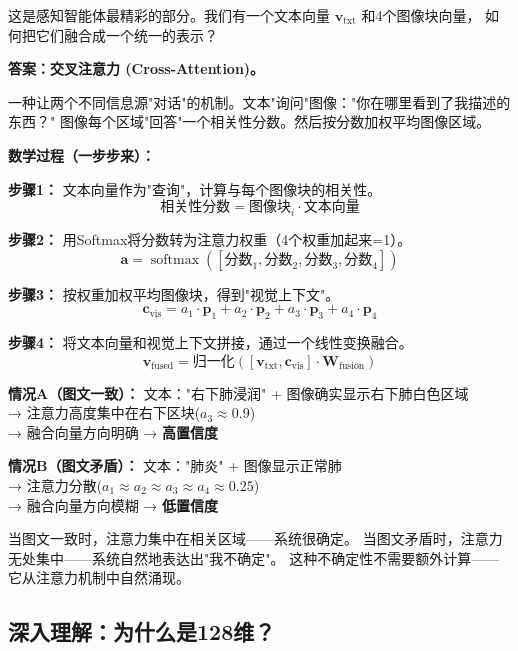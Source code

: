 \documentclass[11pt,a4paper]{ctexart}
\DeclareMathOperator{\softmax}{softmax}
\begin{document}
这是感知智能体最精彩的部分。我们有一个文本向量 $\mathbf{v}_{\text{txt}}$ 和4个图像块向量，
如何把它们融合成一个统一的表示？

\textbf{答案：交叉注意力 (Cross-Attention)。}

\begin{defbox}[交叉注意力]
一种让两个不同信息源"对话"的机制。文本"询问"图像："你在哪里看到了我描述的东西？"
图像每个区域"回答"一个相关性分数。然后按分数加权平均图像区域。
\end{defbox}

\textbf{数学过程（一步步来）：}

\textbf{步骤1：} 文本向量作为"查询"，计算与每个图像块的相关性。
$$\text{相关性分数} = \text{图像块}_i \cdot \text{文本向量}$$

\textbf{步骤2：} 用Softmax将分数转为注意力权重（4个权重加起来=1）。
$$\mathbf{a} = \softmax([\text{分数}_1, \text{分数}_2, \text{分数}_3, \text{分数}_4])$$

\textbf{步骤3：} 按权重加权平均图像块，得到"视觉上下文"。
$$\mathbf{c}_{\text{vis}} = a_1 \cdot \mathbf{p}_1 + a_2 \cdot \mathbf{p}_2 + a_3 \cdot \mathbf{p}_3 + a_4 \cdot \mathbf{p}_4$$

\textbf{步骤4：} 将文本向量和视觉上下文拼接，通过一个线性变换融合。
$$\mathbf{v}_{\text{fused}} = \text{归一化}([\mathbf{v}_{\text{txt}}, \mathbf{c}_{\text{vis}}] \cdot \mathbf{W}_{\text{fusion}})$$

\begin{exambox}[两种情况对比]
\textbf{情况A（图文一致）：}
文本："右下肺浸润" + 图像确实显示右下肺白色区域\\
→ 注意力高度集中在右下区块($a_3 \approx 0.9$)\\
→ 融合向量方向明确 → \textbf{高置信度}

\textbf{情况B（图文矛盾）：}
文本："肺炎" + 图像显示正常肺\\
→ 注意力分散($a_1 \approx a_2 \approx a_3 \approx a_4 \approx 0.25$)\\
→ 融合向量方向模糊 → \textbf{低置信度}
\end{exambox}

\begin{keybox}
当图文一致时，注意力集中在相关区域——系统很确定。
当图文矛盾时，注意力无处集中——系统自然地表达出"我不确定"。
这种不确定性不需要额外计算——它从注意力机制中自然涌现。
\end{keybox}

\subsection{深入理解：为什么是128维？}
\end{document}
